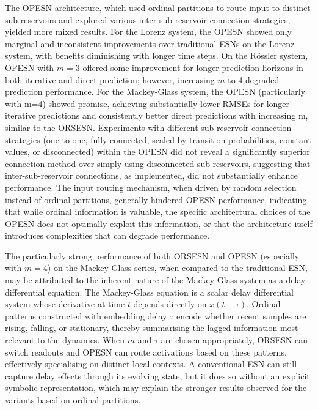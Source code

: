 The OPESN architecture, which used ordinal partitions to route input to distinct sub-reservoirs and explored various inter-sub-reservoir connection strategies, yielded more mixed results. For the Lorenz system, the OPESN showed only marginal and inconsistent improvements over traditional ESNs on the Lorenz system, with benefits diminishing with longer time steps. On the Rössler system, OPESN with $m=3$ offered some improvement for longer prediction horizons in both iterative and direct prediction; however, increasing $m$ to 4 degraded prediction performance. For the Mackey-Glass system, the OPESN (particularly with m=4) showed promise, achieving substantially lower RMSEs for longer iterative predictions and consistently better direct predictions with increasing m, similar to the ORSESN. Experiments with different sub-reservoir connection strategies (one-to-one, fully connected, scaled by transition probabilities, constant values, or disconnected) within the OPESN did not reveal a significantly superior connection method over simply using disconnected sub-reservoirs, suggesting that inter-sub-reservoir connections, as implemented, did not substantially enhance performance. The input routing mechanism, when driven by random selection instead of ordinal partitions, generally hindered OPESN performance, indicating that while ordinal information is valuable, the specific architectural choices of the OPESN does not optimally exploit this information, or that the architecture itself introduces complexities that can degrade performance.

The particularly strong performance of both ORSESN and OPESN (especially with $m=4$) on the Mackey-Glass series, when compared to the traditional ESN, may be attributed to the inherent nature of the Mackey-Glass system as a delay-differential equation. The Mackey-Glass equation is a scalar delay differential system whose derivative at time $t$ depends directly on $x(t-\tau)$. Ordinal patterns constructed with embedding delay $\tau$ encode whether recent samples are rising, falling, or stationary, thereby summarising the lagged information most relevant to the dynamics. When $m$ and $\tau$ are chosen appropriately, ORSESN can switch readouts and OPESN can route activations based on these patterns, effectively specialising on distinct local contexts. A conventional ESN can still capture delay effects through its evolving state, but it does so without an explicit symbolic representation, which may explain the stronger results observed for the variants based on ordinal partitions.

